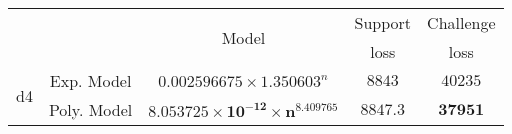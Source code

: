 \begin{tabular}{ccccc} 
\hline 
 &  & \multirow{2}{*}{Model} & Support & Challenge\tabularnewline 
 &  &  & loss  & loss\tabularnewline 
\hline 
\hline 
\multirow{2}{*}{d4} & Exp. Model & $0.002596675\times 1.350603^{n}$ & $8843$ & $40235$ \tabularnewline 
 & Poly. Model & $\mathbf{8.053725\times10^{-12}\times n^{8.409765}}$ & $\mathbf{8847.3}$ & $\mathbf{37951}$ \tabularnewline 
\hline 
\end{tabular} 

